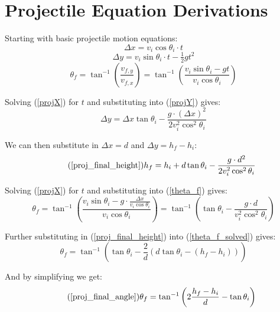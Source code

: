 \documentclass[11pt,a4paper,titlepage]{article}
\begin{document}
	\section{Projectile Equation Derivations} \label{appendixC}
	Starting with basic projectile motion equations:
	\begin{equation} \label{projX}
		\Delta x = v_i \cos \theta_i \cdot t
	\end{equation}
	\begin{equation} \label{projY}
		\Delta y = v_i \sin \theta_i \cdot t - \tfrac{1}{2} g t^2
	\end{equation}
	\begin{equation} \label{theta_f}
		\theta_f = \tan^{-1} \left( \frac{v_{f,y}}{v_{f,x}} \right) = \tan^{-1} \left( \frac{v_i \sin \theta_i - g t}{v_i \cos \theta_i} \right)
	\end{equation}
	
	Solving (\ref{projX}) for $t$ and substituting into (\ref{projY}) gives:
	\begin{equation}
		\Delta y = \Delta x \tan \theta_i - \frac{g \cdot (\Delta x)^2}{2 v_i^2 \cos^2 \theta_i}
	\end{equation}
	
	We can then substitute in $\Delta x = d$ and $\Delta y = h_f - h_i$:
	\begin{equation} \tag{\ref*{proj_final_height}}
		h_f = h_i + d \tan \theta_i - \frac{g \cdot d^2}{2 v_i^2 \cos^2 \theta_i}
	\end{equation}
	
	Solving (\ref{projX}) for $t$ and substituting into (\ref{theta_f}) gives:
	\begin{equation} \label{theta_f_solved}
		\theta_f = \tan^{-1} \left( \frac{v_i \sin \theta_i - g \cdot \frac{\Delta x}{v_i \cos \theta_i}}{v_i \cos \theta_i} \right) = \tan^{-1} \left( \tan \theta_i - \frac{g \cdot d}{v_i^2 \cos^2 \theta_i} \right)
	\end{equation}
	
	Further substituting in (\ref{proj_final_height}) into (\ref{theta_f_solved}) gives:
	\begin{equation} \label{theta_f_transform}
		\theta_f = \tan^{-1} \left( \tan \theta_i - \frac{2}{d} (d \tan \theta_i - (h_f - h_i)) \right)
	\end{equation}
	
	And by simplifying we get:
	\begin{equation} \tag{\ref*{proj_final_angle}}
		\theta_f = \tan^{-1} \left( 2 \frac{h_f - h_i}{d} - \tan \theta_i \right)
	\end{equation}
	
\end{document}

